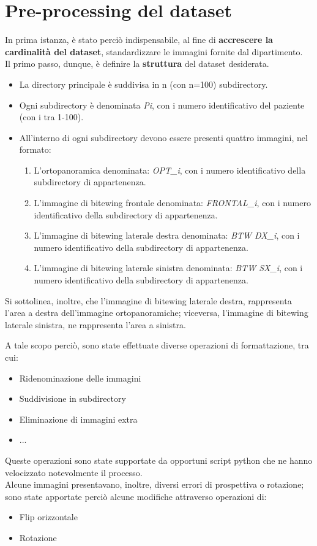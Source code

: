 \documentclass[12pt,a4paper,openright,twoside]{book}
\begin{document}
\section{Pre-processing del dataset}
In prima istanza, è stato perciò indispensabile, al fine di \textbf{accrescere la cardinalità del dataset}, standardizzare le immagini fornite dal dipartimento.\\
Il primo passo, dunque, è definire la \textbf{struttura} del dataset desiderata.
\begin{itemize}
\item La directory principale è suddivisa in n (con n=100) subdirectory.
\item Ogni subdirectory è denominata {\itshape Pi}, con i numero identificativo del paziente (con i tra 1-100).
\item All'interno di ogni subdirectory devono essere presenti quattro immagini, nel formato:
\begin{enumerate}
\item L'ortopanoramica denominata: {\itshape OPT\_i}, con i numero identificativo della subdirectory di appartenenza. 
\item L'immagine di bitewing frontale denominata: {\itshape FRONTAL\_i}, con i numero identificativo della subdirectory di appartenenza. 
\item L'immagine di bitewing laterale destra denominata: {\itshape BTW DX\_i}, con i numero identificativo della subdirectory di appartenenza. 
\item L'immagine di bitewing laterale sinistra denominata: {\itshape BTW SX\_i}, con i numero identificativo della subdirectory di appartenenza. 
\end{enumerate}
\end{itemize}
Si sottolinea, inoltre, che l'immagine di bitewing laterale destra, rappresenta l'area a destra dell'immagine ortopanoramiche; viceversa, l'immagine di bitewing laterale sinistra, ne rappresenta l'area a sinistra.

A tale scopo perciò, sono state effettuate diverse operazioni di formattazione, tra cui:
\begin{itemize}
\item Ridenominazione delle immagini
\item Suddivisione in subdirectory
\item Eliminazione di immagini extra
\item ...
\end{itemize}
Queste operazioni sono state supportate da opportuni script python che ne hanno velocizzato notevolmente il processo.\\
Alcune immagini presentavano, inoltre, diversi errori di prospettiva o rotazione; sono state apportate perciò alcune modifiche attraverso operazioni di:
\begin{itemize}
\item Flip orizzontale
\item Rotazione
\end{itemize}
\end{document}
